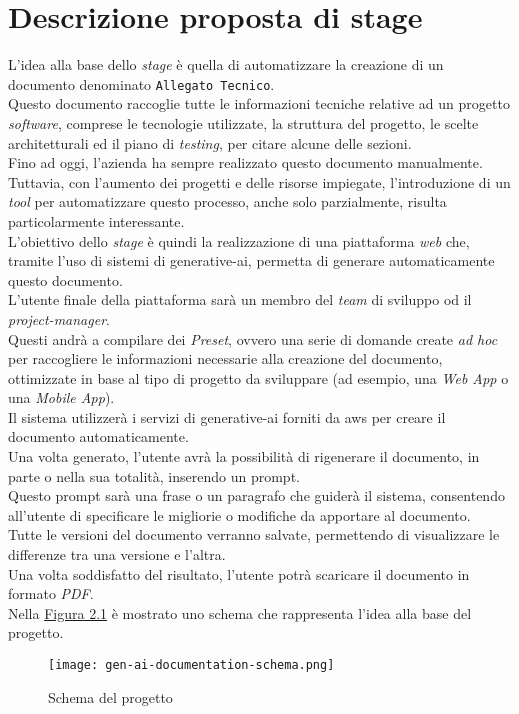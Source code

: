 \section{Descrizione proposta di stage}
\label{sez:descrizione-stage}

L'idea alla base dello \textit{stage} è quella di automatizzare la creazione di un documento denominato \texttt{Allegato Tecnico}.\\  
Questo documento raccoglie tutte le informazioni tecniche relative ad un progetto \textit{software}, comprese le tecnologie utilizzate,
la struttura del progetto, le scelte architetturali ed il piano di \textit{testing}, per citare alcune delle sezioni.\\  
Fino ad oggi, l'azienda ha sempre realizzato questo documento manualmente.\\
Tuttavia, con l'aumento dei progetti e delle risorse impiegate,
l'introduzione di un \textit{tool} per automatizzare questo processo, anche solo parzialmente, risulta particolarmente interessante.\\  

\noindent L'obiettivo dello \textit{stage} è quindi la realizzazione di una piattaforma \textit{web} che, tramite l'uso di sistemi di \gls{generative-ai},  
permetta di generare automaticamente questo documento.\\  
L'utente finale della piattaforma sarà un membro del \textit{team} di sviluppo od il \textit{project-manager}.\\  
Questi andrà a compilare dei \textit{Preset}, ovvero una serie di domande create \textit{ad hoc}
per raccogliere le informazioni necessarie alla creazione del documento, ottimizzate in base al tipo di progetto da sviluppare (ad esempio, una \textit{Web App} o una \textit{Mobile App}).\\  
Il sistema utilizzerà i servizi di \gls{generative-ai} forniti da \gls{aws} per creare il documento automaticamente.\\  

\noindent Una volta generato, l'utente avrà la possibilità di rigenerare il documento, in parte o nella sua totalità, inserendo un \gls{prompt}.\\  
Questo \gls{prompt} sarà una frase o un paragrafo che guiderà il sistema, consentendo all'utente di specificare le migliorie o modifiche da apportare al documento.\\  
Tutte le versioni del documento verranno salvate, permettendo di visualizzare le differenze tra una versione e l'altra.\\  
Una volta soddisfatto del risultato, l'utente potrà scaricare il documento in formato \textit{PDF}.\\  
Nella {\hyperref[fig:project-schema]{Figura 2.1}} è mostrato uno schema che rappresenta l'idea alla base del progetto.\\  


\begin{figure}[H]
    \label{fig:project-schema}
    \centering
    \texttt{[image: gen-ai-documentation-schema.png]}
    \caption{Schema del progetto}
\end{figure}